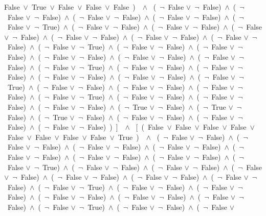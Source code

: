 ﻿\documentclass[a4paper,10pt]{article}
\begin{document}
False\ $\vee$\ True\ $\vee$\ False\ $\vee$\ False\ $\vee$\ False\ )\ \ $\wedge$ \ (\  $\neg$\ False $\vee$\  $\neg$\ False)\ $\wedge$\ (\  $\neg$\ False $\vee$\  $\neg$\ False)\ $\wedge$\ (\  $\neg$\ False $\vee$\  $\neg$\ False)\ $\wedge$\ (\  $\neg$\ False $\vee$\  $\neg$\ False)\ $\wedge$\ (\  $\neg$\ False $\vee$\  $\neg$\ True)\ $\wedge$\ (\  $\neg$\ False $\vee$\  $\neg$\ False)\ $\wedge$\ (\  $\neg$\ False $\vee$\  $\neg$\ False)\ $\wedge$\ (\  $\neg$\ False $\vee$\  $\neg$\ False)\ $\wedge$\ (\  $\neg$\ False $\vee$\  $\neg$\ False)\ $\wedge$\ (\  $\neg$\ False $\vee$\  $\neg$\ False)\ $\wedge$\ (\  $\neg$\ False $\vee$\  $\neg$\ False)\ $\wedge$\ (\  $\neg$\ False $\vee$\  $\neg$\ True)\ $\wedge$\ (\  $\neg$\ False $\vee$\  $\neg$\ False)\ $\wedge$\ (\  $\neg$\ False $\vee$\  $\neg$\ False)\ $\wedge$\ (\  $\neg$\ False $\vee$\  $\neg$\ False)\ $\wedge$\ (\  $\neg$\ False $\vee$\  $\neg$\ False)\ $\wedge$\ (\  $\neg$\ False $\vee$\  $\neg$\ False)\ $\wedge$\ (\  $\neg$\ False $\vee$\  $\neg$\ True)\ $\wedge$\ (\  $\neg$\ False $\vee$\  $\neg$\ False)\ $\wedge$\ (\  $\neg$\ False $\vee$\  $\neg$\ False)\ $\wedge$\ (\  $\neg$\ False $\vee$\  $\neg$\ False)\ $\wedge$\ (\  $\neg$\ False $\vee$\  $\neg$\ False)\ $\wedge$\ (\  $\neg$\ False $\vee$\  $\neg$\ True)\ $\wedge$\ (\  $\neg$\ False $\vee$\  $\neg$\ False)\ $\wedge$\ (\  $\neg$\ False $\vee$\  $\neg$\ False)\ $\wedge$\ (\  $\neg$\ False $\vee$\  $\neg$\ False)\ $\wedge$\ (\  $\neg$\ False $\vee$\  $\neg$\ True)\ $\wedge$\ (\  $\neg$\ False $\vee$\  $\neg$\ False)\ $\wedge$\ (\  $\neg$\ False $\vee$\  $\neg$\ False)\ $\wedge$\ (\  $\neg$\ False $\vee$\  $\neg$\ False)\ $\wedge$\ (\  $\neg$\ True $\vee$\  $\neg$\ False)\ $\wedge$\ (\  $\neg$\ True $\vee$\  $\neg$\ False)\ $\wedge$\ (\  $\neg$\ True $\vee$\  $\neg$\ False)\ $\wedge$\ (\  $\neg$\ False $\vee$\  $\neg$\ False)\ $\wedge$\ (\  $\neg$\ False $\vee$\  $\neg$\ False)\ $\wedge$\ (\  $\neg$\ False $\vee$\  $\neg$\ False)\ )\ ]\ \ $\wedge$ \ [\ (\ False\ $\vee$\ False\ $\vee$\ False\ $\vee$\ False\ $\vee$\ False\ $\vee$\ False\ $\vee$\ False\ $\vee$\ False\ $\vee$\ True\ )\ \ $\wedge$ \ (\  $\neg$\ False $\vee$\  $\neg$\ False)\ $\wedge$\ (\  $\neg$\ False $\vee$\  $\neg$\ False)\ $\wedge$\ (\  $\neg$\ False $\vee$\  $\neg$\ False)\ $\wedge$\ (\  $\neg$\ False $\vee$\  $\neg$\ False)\ $\wedge$\ (\  $\neg$\ False $\vee$\  $\neg$\ False)\ $\wedge$\ (\  $\neg$\ False $\vee$\  $\neg$\ False)\ $\wedge$\ (\  $\neg$\ False $\vee$\  $\neg$\ False)\ $\wedge$\ (\  $\neg$\ False $\vee$\  $\neg$\ True)\ $\wedge$\ (\  $\neg$\ False $\vee$\  $\neg$\ False)\ $\wedge$\ (\  $\neg$\ False $\vee$\  $\neg$\ False)\ $\wedge$\ (\  $\neg$\ False $\vee$\  $\neg$\ False)\ $\wedge$\ (\  $\neg$\ False $\vee$\  $\neg$\ False)\ $\wedge$\ (\  $\neg$\ False $\vee$\  $\neg$\ False)\ $\wedge$\ (\  $\neg$\ False $\vee$\  $\neg$\ False)\ $\wedge$\ (\  $\neg$\ False $\vee$\  $\neg$\ True)\ $\wedge$\ (\  $\neg$\ False $\vee$\  $\neg$\ False)\ $\wedge$\ (\  $\neg$\ False $\vee$\  $\neg$\ False)\ $\wedge$\ (\  $\neg$\ False $\vee$\  $\neg$\ False)\ $\wedge$\ (\  $\neg$\ False $\vee$\  $\neg$\ False)\ $\wedge$\ (\  $\neg$\ False $\vee$\  $\neg$\ False)\ $\wedge$\ (\  $\neg$\ False $\vee$\  $\neg$\ True)\ $\wedge$\ (\  $\neg$\ False $\vee$\  $\neg$\ False)\ $\wedge$\ (\  $\neg$\ False $\vee$\  
\end{document}
